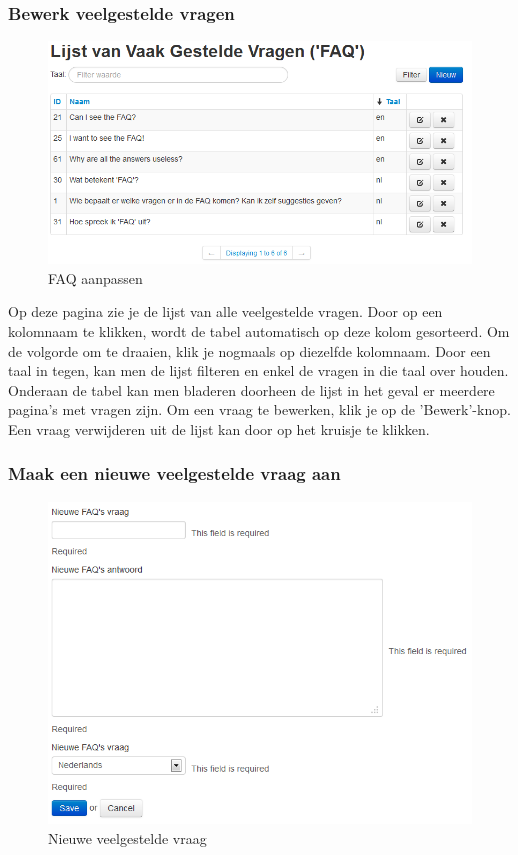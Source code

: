 \documentclass[]{article}
\begin{document}
\subsubsection{Bewerk veelgestelde vragen}

\begin{figure}[!ht]
	\centering
	\includegraphics[width=1\textwidth]{img/faqmgmt}
	\caption{FAQ aanpassen}
	\label{faqmgmt}
\end{figure}

Op deze pagina zie je de lijst van alle veelgestelde vragen. Door op een kolomnaam te klikken, wordt de tabel automatisch op deze kolom gesorteerd. Om de volgorde om te draaien, klik je nogmaals op diezelfde kolomnaam. Door een taal in tegen, kan men de lijst filteren en enkel de vragen in die taal over houden. Onderaan de tabel kan men bladeren doorheen de lijst in het geval er meerdere pagina's met vragen zijn. Om een vraag te bewerken, klik je op de 'Bewerk'-knop. Een vraag verwijderen uit de lijst kan door op het kruisje te klikken.

\subsubsection{Maak een nieuwe veelgestelde vraag aan}

\begin{figure}[!ht]
	\centering
	\includegraphics[width=1\textwidth]{img/new_faq}
	\caption{Nieuwe veelgestelde vraag}
	\label{new_faq}
\end{figure}
\end{document}
